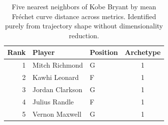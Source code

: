 \begin{table}[htbp]
  \centering\small
  \begin{tabular}{rllc}
    \toprule
    Rank & Player & Position & Archetype \\
    \midrule
    1 & Mitch Richmond & G & 1 \\
    2 & Kawhi Leonard & F & 1 \\
    3 & Jordan Clarkson & G & 1 \\
    4 & Julius Randle & F & 1 \\
    5 & Vernon Maxwell & G & 1 \\
    \bottomrule
  \end{tabular}
  \caption{Five nearest neighbors of Kobe Bryant by mean Fr\'{e}chet curve distance across metrics. Identified purely from trajectory shape without dimensionality reduction.}
  \label{tab:Kobe_Bryant_frechet_curve_neighbors}
\end{table}

